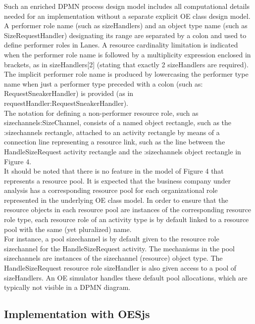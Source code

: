 \documentclass{article}
\begin{document}
\FloatBarrier
Such an enriched DPMN process design model includes all computational details needed for an implementation without a separate explicit OE class design model. \\
A performer role name (such as sizeHandlers) and an object type name (such as SizeRequestHandler) designating its range are separated by a colon and used to define performer roles in Lanes. A resource cardinality limitation is indicated when the performer role name is followed by a multiplicity expression enclosed in brackets, as in sizeHandlers[2] (stating that exactly 2 sizeHandlers are required).\\
The implicit performer role name is produced by lowercasing the performer type name when just a performer type preceded with a colon (such as: RequestSneakerHandler) is provided (as in requestHandler:RequestSneakerHandler).\\
The notation for defining a non-performer resource role, such as size\textunderscore channels:SizeChannel, consists of a named object rectangle, such as the :size\textunderscore channels rectangle, attached to an activity rectangle by means of a connection line representing a resource link, such as the line between the HandleSizeRequest activity rectangle and the :size\textunderscore channels object rectangle in Figure 4. \\
It should be noted that there is no feature in the model of Figure 4 that represents a resource pool. It is expected that the business company under analysis has a corresponding resource pool for each organizational role represented in the underlying OE class model. In order to ensure that the resource objects in each resource pool are instances of the corresponding resource role type, each resource role of an activity type is by default linked to a resource pool with the same (yet pluralized) name. \\
For instance, a pool size\textunderscore channel is by default given to the resource role size\textunderscore channel for the HandleSizeRequest activity. The mechanisms in the pool size\textunderscore channels are instances of the size\textunderscore channel (resource) object type. The HandleSizeRequest resource role sizeHandler is also given access to a pool of sizeHandlers.  An OE simulator handles these default pool allocations, which are typically not visible in a DPMN diagram. 

\subsection{Implementation with OESjs}
\end{document}
